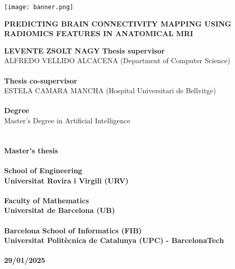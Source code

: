 \begin{titlepage}
    \begin{center}
        \begingroup
          \let\clearpage\relax
          \texttt{[image: banner.png]}
          \vfill
          \LARGE
          \begin{center}
          \textbf{\MakeUppercase{Predicting Brain Connectivity Mapping Using Radiomics Features in Anatomical MRI}}
          \end{center}
          \vfill
          \large
          \textbf{\MakeUppercase{Levente Zsolt Nagy}}
          \vfill
          \normalsize
          \textbf{Thesis supervisor}\\
          \MakeUppercase{Alfredo Vellido Alcacena} (Department of Computer Science)\\
          \hfill\\
          \textbf{Thesis co-supervisor}\\
          \MakeUppercase{Estela Camara Mancha} (Hospital Universitari de Bellvitge)\\
          \hfill\\
          \textbf{Degree}\\
          Master's Degree in Artificial Intelligence\\
          \hfill\\\hfill\\
          \textbf{Master's thesis}\\
          \hfill\\
          \textbf{School of Engineering}\\
          \textbf{Universitat Rovira i Virgili (URV)}\\
          \hfill\\
          \textbf{Faculty of Mathematics}\\
          \textbf{Universitat de Barcelona (UB)}\\
          \hfill\\
          \textbf{Barcelona School of Informatics (FIB)}\\
          \textbf{Universitat Politècnica de Catalunya (UPC) - BarcelonaTech}\\
          \hfill\\
          \textbf{29/01/2025}\\
        \endgroup
    \end{center}
\end{titlepage}